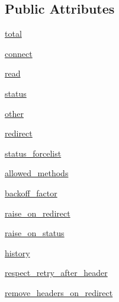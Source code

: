\subsection*{Public Attributes}
\begin{DoxyCompactItemize}
\item 
\hyperlink{classpip_1_1__vendor_1_1urllib3_1_1util_1_1retry_1_1Retry_a1423df3e0da537e7dc592f19a61b331c}{total}
\item 
\hyperlink{classpip_1_1__vendor_1_1urllib3_1_1util_1_1retry_1_1Retry_afb533b8543e1044a946045cdd154177e}{connect}
\item 
\hyperlink{classpip_1_1__vendor_1_1urllib3_1_1util_1_1retry_1_1Retry_afd3c709481067e83f8b20434c45799b0}{read}
\item 
\hyperlink{classpip_1_1__vendor_1_1urllib3_1_1util_1_1retry_1_1Retry_a9371430d20ac40d55729f59cb7253db7}{status}
\item 
\hyperlink{classpip_1_1__vendor_1_1urllib3_1_1util_1_1retry_1_1Retry_a31dfbddfc33a3f34cc8ff51c8637a600}{other}
\item 
\hyperlink{classpip_1_1__vendor_1_1urllib3_1_1util_1_1retry_1_1Retry_a9752f0c412ef4705c9775d4c08566b3b}{redirect}
\item 
\hyperlink{classpip_1_1__vendor_1_1urllib3_1_1util_1_1retry_1_1Retry_ac038b86707cb00f3a82b52de19cee992}{status\+\_\+forcelist}
\item 
\hyperlink{classpip_1_1__vendor_1_1urllib3_1_1util_1_1retry_1_1Retry_a565c1de580794a7996dcb3ab2dc4a6ef}{allowed\+\_\+methods}
\item 
\hyperlink{classpip_1_1__vendor_1_1urllib3_1_1util_1_1retry_1_1Retry_a80f4e9b000c81ba7992ba09ff3173c18}{backoff\+\_\+factor}
\item 
\hyperlink{classpip_1_1__vendor_1_1urllib3_1_1util_1_1retry_1_1Retry_a9e8629af5665c5aaeb4adeaf1670deef}{raise\+\_\+on\+\_\+redirect}
\item 
\hyperlink{classpip_1_1__vendor_1_1urllib3_1_1util_1_1retry_1_1Retry_a3ff302836e2347a99bd39cdd58b22e91}{raise\+\_\+on\+\_\+status}
\item 
\hyperlink{classpip_1_1__vendor_1_1urllib3_1_1util_1_1retry_1_1Retry_a212858c95f415ef07d3252d98854b378}{history}
\item 
\hyperlink{classpip_1_1__vendor_1_1urllib3_1_1util_1_1retry_1_1Retry_af51e9fbb8aef0543109ae31a4c110647}{respect\+\_\+retry\+\_\+after\+\_\+header}
\item 
\hyperlink{classpip_1_1__vendor_1_1urllib3_1_1util_1_1retry_1_1Retry_afae2e00f6ae119ae9bd761222939d470}{remove\+\_\+headers\+\_\+on\+\_\+redirect}
\end{DoxyCompactItemize}
